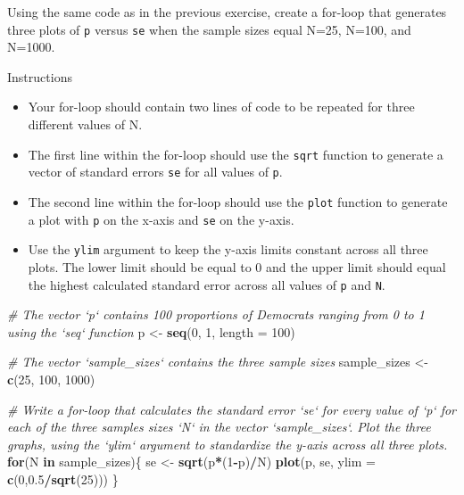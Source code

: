 \documentclass[]{article}
\newenvironment{Shaded}{\begin{snugshade}}{\end{snugshade}}
\newcommand{\KeywordTok}[1]{\textcolor[rgb]{0.13,0.29,0.53}{\textbf{#1}}}
\newcommand{\DataTypeTok}[1]{\textcolor[rgb]{0.13,0.29,0.53}{#1}}
\newcommand{\DecValTok}[1]{\textcolor[rgb]{0.00,0.00,0.81}{#1}}
\newcommand{\FloatTok}[1]{\textcolor[rgb]{0.00,0.00,0.81}{#1}}
\newcommand{\StringTok}[1]{\textcolor[rgb]{0.31,0.60,0.02}{#1}}
\newcommand{\CommentTok}[1]{\textcolor[rgb]{0.56,0.35,0.01}{\textit{#1}}}
\newcommand{\ControlFlowTok}[1]{\textcolor[rgb]{0.13,0.29,0.53}{\textbf{#1}}}
\newcommand{\OperatorTok}[1]{\textcolor[rgb]{0.81,0.36,0.00}{\textbf{#1}}}
\newcommand{\NormalTok}[1]{#1}
\providecommand{\tightlist}{%
  \setlength{\itemsep}{0pt}\setlength{\parskip}{0pt}}
\begin{document}
Using the same code as in the previous exercise, create a for-loop that
generates three plots of \texttt{p} versus \texttt{se} when the sample
sizes equal N=25, N=100, and N=1000.

Instructions

\begin{itemize}
\tightlist
\item
  Your for-loop should contain two lines of code to be repeated for
  three different values of N.
\item
  The first line within the for-loop should use the \texttt{sqrt}
  function to generate a vector of standard errors \texttt{se} for all
  values of \texttt{p}.
\item
  The second line within the for-loop should use the \texttt{plot}
  function to generate a plot with \texttt{p} on the x-axis and
  \texttt{se} on the y-axis.
\item
  Use the \texttt{ylim} argument to keep the y-axis limits constant
  across all three plots. The lower limit should be equal to 0 and the
  upper limit should equal the highest calculated standard error across
  all values of \texttt{p} and \texttt{N}.
\end{itemize}

\begin{Shaded}
\begin{Highlighting}[]
\CommentTok{# The vector `p` contains 100 proportions of Democrats ranging from 0 to 1 using the `seq` function}
\NormalTok{p <-}\StringTok{ }\KeywordTok{seq}\NormalTok{(}\DecValTok{0}\NormalTok{, }\DecValTok{1}\NormalTok{, }\DataTypeTok{length =} \DecValTok{100}\NormalTok{)}

\CommentTok{# The vector `sample_sizes` contains the three sample sizes}
\NormalTok{sample_sizes <-}\StringTok{ }\KeywordTok{c}\NormalTok{(}\DecValTok{25}\NormalTok{, }\DecValTok{100}\NormalTok{, }\DecValTok{1000}\NormalTok{)}

\CommentTok{# Write a for-loop that calculates the standard error `se` for every value of `p` for each of the three samples sizes `N` in the vector `sample_sizes`. Plot the three graphs, using the `ylim` argument to standardize the y-axis across all three plots.}
\ControlFlowTok{for}\NormalTok{(N }\ControlFlowTok{in}\NormalTok{ sample_sizes)\{}
\NormalTok{  se <-}\StringTok{ }\KeywordTok{sqrt}\NormalTok{(p}\OperatorTok{*}\NormalTok{(}\DecValTok{1}\OperatorTok{-}\NormalTok{p)}\OperatorTok{/}\NormalTok{N)}
  \KeywordTok{plot}\NormalTok{(p, se, }\DataTypeTok{ylim =} \KeywordTok{c}\NormalTok{(}\DecValTok{0}\NormalTok{,}\FloatTok{0.5}\OperatorTok{/}\KeywordTok{sqrt}\NormalTok{(}\DecValTok{25}\NormalTok{)))}
\NormalTok{\}}
\end{Highlighting}
\end{Shaded}
\end{document}
